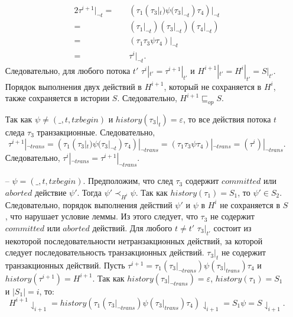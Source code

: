 \begin{myproof}
\begin{enumerate}[listparindent=1.5em]
\begin{alignat}{2}
\tau^{i+1}|_{\neg t} =& \quad (\tau_1(\tau_3|_t)\psi(\tau_3|_{\neg t})\tau_4)|_{\neg t} \nonumber \\
                     =& \quad (\tau_1|_{\neg t})(\tau_3|_{\neg t})(\tau_4|_{\neg t})\nonumber \\
                     =& \quad (\tau_1\tau_3\psi\tau_4)|_{\neg t} \nonumber \\
                     =& \quad \tau^i|_{\neg t}. \nonumber
\end{alignat}
Следовательно, для любого потока $t'$ $\tau^i|_{t'} = \tau^{i+1}|_{t'}$ и $H^{i+1}|_{t'} = H^i|_{t'} = S|_{t'}$. Порядок выполнения двух действий в $H^{i+1}$, который не сохраняется в $H^i$, также сохраняется в истории $S$. Следовательно, $H^{i+1} \sqsubseteq_{op} S$. 

Так как $\psi \neq (\_, t, txbegin)$ и $history(\tau_3|_t) = \varepsilon$, то все действия потока $t$ следа $\tau_3$ транзакционные. Следовательно, $$\tau^{i+1}|_{\neg trans} = (\tau_1(\tau_3|_t)\psi(\tau_3|_{\neg t})\tau_4)|_{\neg trans} = (\tau_1\tau_3\psi\tau_4)|_{\neg trans} = (\tau^i)|_{\neg trans}.$$
Следовательно, $\tau^i|_{\neg trans} = \tau^{i+1}|_{\neg trans}$.

\item[--] $\psi = (\_, t, txbegin)$. Предположим, что след $\tau_3$ содержит $committed$ или $aborted$ действие $\psi'$. Тогда $\psi' \prec_{H^{i}} \psi$. Так как $history(\tau_1) = S_1$, то $\psi' \in S_2$. Следовательно, порядок выполнения действий $\psi'$ и $\psi$ в $H^i$ не сохраняется в $S$, что нарушает условие леммы. Из этого следует, что $\tau_3$ не содержит $committed$ или $aborted$ действий. Для любого $t \neq t'$ $\tau_3|_{t'}$ состоит из некоторой последовательности нетранзакционных действий, за которой следует последовательность транзакционных действий. $\tau_3|_t$ не содержит транзакционных действий. Пусть $\tau^{i+1} = \tau_1(\tau_3|_{\neg trans})\psi(\tau_3|_{trans})\tau_4$ и $history(\tau^{i+1}) = H^{i+1}$. Так как $history(\tau_3|_{\neg trans}) = \varepsilon$, $history(\tau_1) = S_1$ и $|S_1| = i$, то: $$H^{i+1}\downharpoonleft_{i+1} = history(\tau_1(\tau_3|_{\neg trans})\psi(\tau_3|_{trans})\tau_4)\downharpoonleft_{i+1} = S_1\psi = S\downharpoonleft_{i+1}.$$


\end{enumerate}
\end{myproof}
